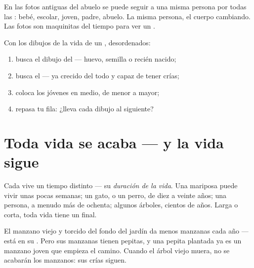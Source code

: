\begin{example}\label{ex:g2:born-grow-die:photo}
En las fotos antiguas del abuelo se puede seguir a una misma persona
por todas las : bebé, escolar, joven, padre, abuelo. La misma
persona, el cuerpo cambiando. Las fotos son maquinitas del tiempo para
ver un .
\end{example}

\begin{method}\label{met:g2:born-grow-die:order}
Con los dibujos de la vida de un , desordenados:
\begin{enumerate}
  \item busca el dibujo del  --- huevo, semilla o recién nacido;
  \item busca el  --- ya crecido del todo y capaz de tener crías;
  \item coloca los jóvenes en medio, de menor a mayor;
  \item repasa tu fila: ¿lleva cada dibujo al siguiente?
\end{enumerate}
\end{method}

\section{Toda vida se acaba --- y la vida sigue}

\begin{proposition}\label{prop:g2:born-grow-die:lifespan}
Cada  vive un tiempo distinto --- su \emph{duración de la
vida}. Una mariposa puede vivir unas pocas
semanas; un gato, o un perro, de diez a veinte años; una persona, a
menudo más de ochenta; algunos árboles, cientos de años. Larga o
corta, toda vida tiene un final.
\end{proposition}
\admitted

\begin{example}\label{ex:g2:born-grow-die:oldtree}
El manzano viejo y torcido del fondo del jardín da menos manzanas cada
año --- está en su . Pero sus manzanas tienen pepitas, y una
pepita plantada ya es un manzano joven que empieza el camino. Cuando
el árbol viejo muera, no se acabarán los manzanos: sus crías siguen.
\end{example}

